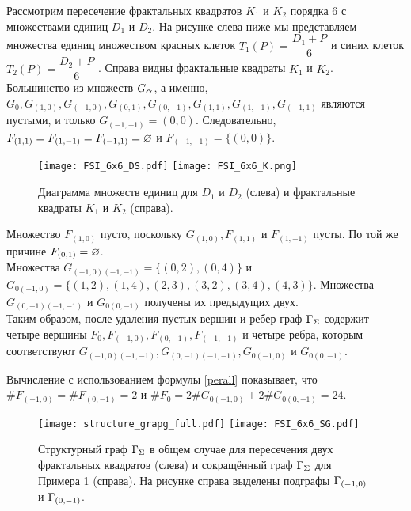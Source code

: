 \begin{example} 

Рассмотрим пересечение фрактальных квадратов $K_1$ и $K_2$ порядка $6$ с множествами единиц $D_1$ и $D_2$.
На рисунке слева ниже мы представляем множества единиц множеством красных клеток $T_1(P)=\dfrac{D_1+P}{6}$ и синих клеток $T_2(P)=\dfrac{D_2+P}{6}$ .
Справа видны фрактальные квадраты $K_1$ и $K_2$. \\

Большинство из множеств $G_{\bm{\alpha}}$, а именно, \\
$G_0,G_{(1,0)},G_{(-1,0)},G_{(0,1)},G_{(0,-1)},G_{(1,1)},G_{(1,-1)},G_{(-1,1)}$ являются пустыми, и только $G_{(-1,-1)}=(0,0)$. Следовательно, 
$F_{(1,1)}=F_{(1,-1)}=F_{(-1,1)}=\varnothing$ и $F_{(-1,-1)}=\{(0,0)\}$.\\


\begin{figure}[H]
    \texttt{[image: FSI\_6x6\_DS.pdf]}
    \hfill
    \texttt{[image: FSI\_6x6\_K.png]}
    \caption{Диаграмма множеств единиц для $D_1$ и $D_2$ (слева) и фрактальные квадраты $K_1$ и $K_2$ (справа).}
\end{figure}


Множество $F_{(1,0)}$ пусто, поскольку $G_{(1,0)},F_{(1,1)}$ и $F_{(1,-1)}$ пусты. 
По той же причине $F_{(0,1)}=\varnothing$. \\

Множества $G_{(-1,0)(-1,-1)}=\{(0,2),(0,4)\}$ и \\
$G_{0(-1,0)}=\{(1,2),(1,4),(2,3),(3,2),(3,4),(4,3)\}$.
Множества $G_{(0,-1)(-1,-1)}$ и $G_{0(0,-1)}$ получены их предыдущих двух.\\

Таким образом, после удаления пустых вершин и ребер
граф $\Gamma_\Sigma$ содержит четыре вершины  $F_0,F_{(-1,0)},F_{(0,-1)},F_{(-1,-1)}$ и четыре ребра, которым соответствуют $G_{(-1,0)(-1,-1)}, G_{(0,-1)(-1,-1)},G_{0(-1,0)}$ и $G_{0(0,-1)}$.

Вычисление с использованием формулы \eqref{perall} показывает, что
$\#F_{(-1,0)}=\#F_{(0,-1)}=2$ и $\#F_0=2 \#G_{0(-1,0)}+2\#G_{0(0,-1)}=24.$


\begin{figure}[H]
    \centering
    \texttt{[image: structure\_grapg\_full.pdf]}
    \hfill
    \texttt{[image: FSI\_6x6\_SG.pdf]}
    \caption{Структурный граф $\Gamma_\Sigma$ в общем случае для пересечения двух фрактальных квадратов (слева) и сокращённый граф $\Gamma_\Sigma$ для Примера 1 (справа). На рисунке справа выделены подграфы $\Gamma_{(-1,0)}$ и $\Gamma_{(0,-1)}$. }
\end{figure} 
\end{example} 


